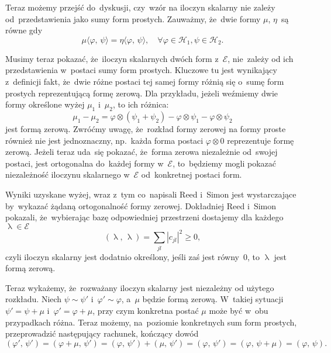 \documentclass[a4paper,11pt]{article}
\newcommand{\mc}{\mathcal}
\newcommand{\la}{\uplambda}
\newcommand{\vp}{\varphi}
\newcommand{\Hc}{\mc{H}}
\newcommand{\ot}{\otimes}
\newcommand{\Sum}{\sum\limits}
\newcommand{\lket}{\langle}
\newcommand{\rket}{\rangle}
\providecommand{\absd}[1]{\left| #1 \right|}
\providecommand{\absd}[1]{\left| \, #1 \, \right|}
\newcommand{\SP}[2]{( #1, \, #2 )} %
\newcommand{\dket}[2]{\lket #1, \, #2 \rket} %
\begin{document}
Teraz możemy przejść do~dyskusji, czy~wzór na iloczyn skalarny nie
zależy od~przedstawienia jako sumy form prostych. Zauważmy, że~dwie
formy $\mu$, $\eta$~są równe gdy
\begin{equation*}
  \mu\dket{ \vp }{ \psi } = \eta\dket{ \vp }{ \psi },
  \quad \forall \vp \in \Hc_{ 1 }, \psi \in \Hc_{ 2 }.
\end{equation*}

Musimy teraz pokazać, że~iloczyn skalarnych dwóch form z~$\mc{E}$,
nie~zależy od ich przedstawienia w~postaci sumy form prostych.
Kluczowe tu jest wynikający z~definicji fakt, że~dwie różne postaci
tej samej formy różnią się o~sumę form prostych reprezentującą formę
zerową. Dla przykładu, jeżeli weźmiemy dwie formy określone wyżej
$\mu_{ 1 }$ i~$\mu_{ 2 }$, to ich różnica:
\begin{equation*}
  \mu_{ 1 } - \mu_{ 2 } = \vp \ot ( \psi_{ 1 } + \psi_{ 2 } )
  - \vp \ot \psi_{ 1 } - \vp \ot \psi_{ 2 }
\end{equation*}
jest formą zerową. Zwróćmy uwagę, że~rozkład formy zerowej na formy
proste również nie jest jednoznaczny, np.~każda forma postaci
$\vp \ot 0$ reprezentuje formę zerową. Jeżeli teraz uda~się pokazać,
że~forma zerowa niezależnie od~swojej postaci, jest ortogonalna
do~każdej formy w~$\mc{E}$, to~będziemy mogli pokazać niezależność
iloczynu skalarnego w~$\mc{E}$ od~konkretnej postaci form.

Wyniki uzyskane wyżej, wraz z~tym co~napisali Reed i~Simon jest
wystarczające by~wykazać żądaną ortogonalność formy zerowej.
Dokładniej Reed i~Simon pokazali, że~wybierając bazę odpowiedniej
przestrzeni dostajemy dla każdego $\la \in \mc{E}$
\begin{equation*}
  ( \la, \, \la ) = \Sum_{ j l } \absd{ c_{ j l } }^{ 2 } \geq 0,
\end{equation*}
czyli iloczyn skalarny jest dodatnio określony, jeśli zaś jest
równy~0, to $\la$ jest formą zerową.

Teraz wykażemy, że~rozważany iloczyn skalarny jest niezależny od
użytego rozkładu. Niech $\psi \sim \psi'$ i~$\vp' \sim \vp$, a~$\mu$
będzie formą zerową. W~takiej sytuacji $\psi' = \psi + \mu$
i~$\vp' = \vp + \mu$, przy czym konkretna postać $\mu$ może być w~obu
przypadkach różna. Teraz możemy, na~poziomie konkretnych sum form
prostych, przeprowadzić następujący rachunek, kończący dowód
\begin{equation*}
  \SP{ \vp' }{ \psi' } = \SP{ \vp + \mu }{ \psi' }
  = \SP{ \vp }{ \psi' } + \SP{ \mu }{ \psi' } = \SP{ \vp }{ \psi' }
  = \SP{ \vp }{ \psi + \mu } = \SP{ \vp }{ \psi }.
\end{equation*}
\end{document}

